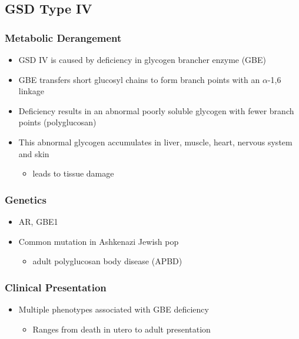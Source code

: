\documentclass{scrartcl}
\begin{document}
\subsection{GSD Type IV}
\label{sec:org624c902}
\subsubsection{Metabolic Derangement}
\label{sec:orgbb2e766}
\begin{itemize}
\item GSD IV is caused by deficiency in glycogen brancher enzyme (GBE)
\item GBE transfers short glucosyl chains to form branch points with an
\(\alpha\)-1,6 linkage
\item Deficiency results in an abnormal poorly soluble glycogen with fewer branch points (polyglucosan)
\item This abnormal glycogen accumulates in liver, muscle, heart, nervous system and skin
\begin{itemize}
\item leads to tissue damage
\end{itemize}
\end{itemize}

\subsubsection{Genetics}
\label{sec:orgfcd1ed6}
\begin{itemize}
\item AR, GBE1
\item Common mutation in Ashkenazi Jewish pop
\begin{itemize}
\item adult polyglucosan body disease (APBD)
\end{itemize}
\end{itemize}

\subsubsection{Clinical Presentation}
\label{sec:orgd22fd8c}

\begin{itemize}
\item Multiple phenotypes associated with GBE deficiency
\begin{itemize}
\item Ranges from death in utero to adult presentation
\end{itemize}
\end{itemize}
\end{document}
